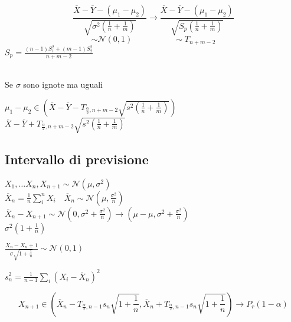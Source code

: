 \documentclass[]{article}
\begin{document}
    \[ \frac{\overline{X} - \overline{Y} - (\mu_1 - \mu_2)}{\sqrt{\sigma^2 (\frac{1}{n} + \frac{1}{m})}} \longrightarrow \frac{\overline{X} - \overline{Y} - (\mu_1 - \mu_2)}{\sqrt{S_p(\frac{1}{n} + \frac{1}{m})}} \]
    \[ \sim \mathcal{N}(0,1) \quad \quad \quad \quad \quad \sim T_{n+m-2}\]
    $S_p = \frac{(n-1) S_1^2 + (m-1) S_2^2}{n+m-2}$ \\ \\
    \centerline{Se $\sigma$ sono ignote ma uguali}
    $\mu_1 - \mu_2 \in (\overline{X} - \overline{Y} -T_{\frac{\alpha}{2},n+m-2} \sqrt{s^2(\frac{1}{n} + \frac{1}{m})})$ \\
    $\overline{X} - \overline{Y} + T_{\frac{\alpha}{2}, n+m-2} \sqrt{s^2 (\frac{1}{n} + \frac{1}{m})}$
    \subsection{Intervallo di previsione}
    $X_1, \ldots X_n, X_{n+1} \sim \mathcal{N}(\mu, \sigma^2)$ \\
    $\overline{X}_n = \frac{1}{n} \sum_{i}^{n} X_i \quad \overline{X}_n \sim \mathcal{N}(\mu, \frac{\sigma^2}{n})$ \\
    $\overline{X}_n - X_{n+1} \sim \mathcal{N}(0, \sigma^2 + \frac{\sigma^2}{n}) \rightarrow (\mu - \mu, \sigma^2 + \frac{\sigma^2}{n})$ \\
    $\sigma^2(1 + \frac{1}{n})$
    \begin{minipage}{0.4\textwidth}
        $\frac{X_n - X_n + 1}{\sigma \sqrt{1 + \frac{1}{n}}} \sim \mathcal{N}(0,1)$
    \end{minipage}
    \begin{minipage}{0.4\textwidth}
        $s_n^2 = \frac{1}{n-1} \sum_{i}^{} (X_i - \overline{X}_n)^2$
    \end{minipage}
    \[ X_{n+1} \in(\overline{X}_n - T_{\frac{\alpha}{2}, n-1} s_n \sqrt{1 + \frac{1}{n}}, \overline{X}_n + T_{\frac{\alpha}{2}, n-1} s_n \sqrt{1 + \frac{1}{n}}) \longrightarrow P_r(1-\alpha) \]
\end{document}

